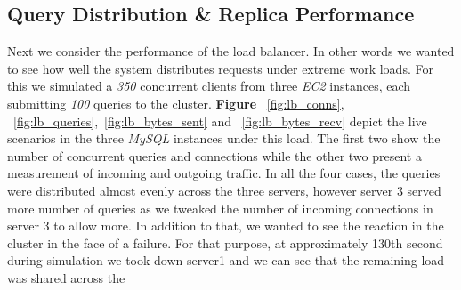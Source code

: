 \documentclass[12pt]{article}
\begin{document}
\subsection{Query Distribution \& Replica Performance} Next we
consider the performance of the load balancer. In other words we wanted to see
how well the system distributes requests under extreme work loads. For this we
simulated a \emph{350} concurrent clients from three \emph{EC2} instances, each
submitting \emph{100} queries to the cluster. \textbf{Figure
}~\ref{fig:lb_conns}, ~\ref{fig:lb_queries},~\ref{fig:lb_bytes_sent} and
~\ref{fig:lb_bytes_recv} depict the live scenarios in the three \emph{MySQL}
instances under this load. The first two show the number of concurrent queries
and connections while the other two present a measurement of incoming and
outgoing traffic. In all the four cases, the queries were distributed almost
evenly across the three servers, however server 3 served more number of queries
as we tweaked the number of incoming connections in server 3 to allow more. In
addition to that, we wanted to see the reaction in the cluster in the face of a
failure. For that purpose, at approximately 130th second during simulation we
took down server1 and we can see that the remaining load was shared across the
\end{document}

